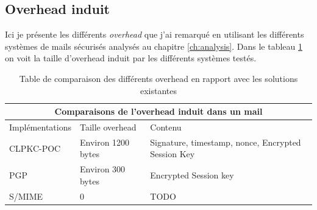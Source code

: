 \subsection{Overhead induit}
Ici je présente les différents \textit{overhead} que j'ai remarqué en utilisant les différents systèmes de mails sécurisés analysés au chapitre \ref{ch:analysis}. Dans le tableau \ref{table:comparisonOverhead} on voit la taille d'overhead induit par les différents systèmes testés.
\begin{table}[h!]
	\centering
	\begin{tabular}{ |p{3cm}||p{5cm}|p{6cm}| }
		\hline
		\multicolumn{3}{|c|}{Comparaisons de l'overhead induit dans un mail} \\
		\hline
		Implémentations & Taille overhead & Contenu\\
		\hline
		CLPKC-POC   & Environ 1200 bytes & Signature, timestamp, nonce, Encrypted Session Key\\
		PGP & Environ 300 bytes & Encrypted Session key\\
		S/MIME & 0 & TODO\\
		\hline
	\end{tabular}
	\caption{Table de comparaison des différents overhead en rapport avec les solutions existantes }
	\label{table:comparisonOverhead}
\end{table}